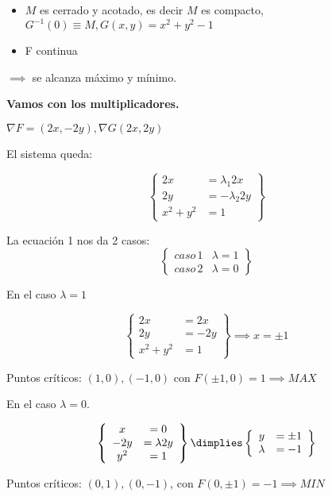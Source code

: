 
\begin{itemize}
\item $M$ es cerrado y acotado, es decir $M$ es compacto, $G^{-1}({0}) \equiv M, G(x,y) = x^2+y^2-1$
\item F continua
\end{itemize}

 $\implies$ se alcanza máximo y mínimo.


\textbf{Vamos con los multiplicadores.}

$\nabla F = (2x,-2y), \nabla G(2x,2y)$

El sistema queda:

\[\left\{\begin{array}{cc}
2x &= \lambda_1 2x  \\
2y &= -\lambda_2 2y\\
x^2+y^2 &= 1
\end{array}\right\}\]

La ecuación 1 nos da 2 casos:
\[\left\{\begin{array}{cc}
caso\, 1 & \lambda = 1\\
caso\, 2 & \lambda = 0
\end{array}\right\}\]

En el caso $\lambda = 1$

\[\left\{\begin{array}{cc}2x&=2x\\2y&=-2y\\x^2+y^2&=1\end{array}\right\} \implies x=\pm 1\]

Puntos críticos: $(1,0),(-1,0)$ con $F(\pm 1,0) = 1 \implies MAX$

En el caso $\lambda = 0$.

\[ \left\{\begin{array}{cc}
x &= 0\\
-2y &= \lambda 2y \\
y^2 &= 1
\end{array}\right\}\dimplies
\left\{ \begin{array}{cc}
y &= \pm 1\\
\lambda &= -1
\end{array}\right\}\]

Puntos críticos: $(0,1),(0,-1)$, con $F(0,\pm 1) = -1 \implies MIN$

